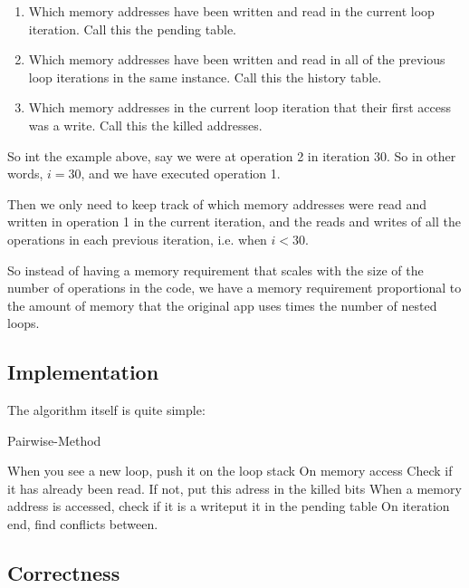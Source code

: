 \documentclass[12pt,twoside]{reedthesis}
\begin{document}
		\begin{enumerate}
			\item Which memory addresses have been written and read in the current loop iteration. Call this the pending table. 
			\item Which memory addresses have been written and read in all of the previous loop iterations in the same instance. Call this the history table.
			\item Which memory addresses in the current loop iteration that their first access was a write. Call this the killed addresses. 
		\end{enumerate}
		
		So int the example above, say we were at operation 2 in iteration 30. So in other words, $i=30$, and we have executed operation 1. 
		
		Then we only need to keep track of which memory addresses were read and written in operation 1 in the current iteration, and the reads and writes of all the operations in each previous iteration, i.e. when $i < 30$. 
		
		So instead of having a memory requirement that scales with the size of the number of operations in the code, we have a memory requirement proportional to the amount of memory that the original app uses times the number of nested loops.
		
		\subsection{Implementation}
		
		The algorithm itself is quite simple:
		
		\begin{algorithm}
			\caption{Pairwise-Method}\label{pairwise-method}
			\begin{algorithmic}[1]
				\State When you see a new loop, push it on the loop stack
				\State On memory access
				\State Check if it has already been read. If not, put this adress in the killed bits
				\EndIf
				\State When a memory address is accessed, check if it is a writeput it in the pending table
				\State On iteration end, find conflicts between. 
				\State 
				\State 
			\end{algorithmic}
		\end{algorithm}
		
		\subsection{Correctness}
		
\end{document}
